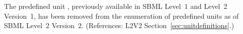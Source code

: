 The predefined unit , previously available in SBML
Level~1 and Level~2 Version~1, has been removed from the \UnitKind
enumeration of predefined units as of SBML Level~2
Version~2.  (References: L2V2 Section~\ref{sec:unitdefinitions}.)
